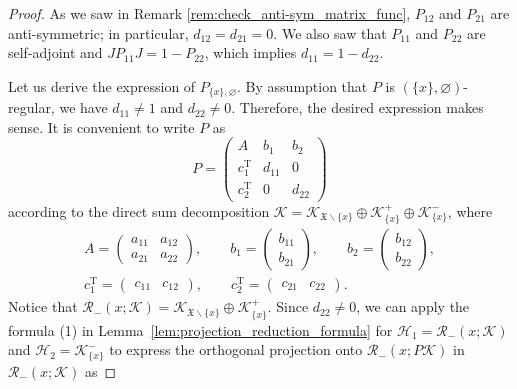 \documentclass[11pt]{article}
\numberwithin{equation}{section}
\numberwithin{equation}{section}
\newcommand{\mfrak}[1]{\mathfrak{#1}}
\newcommand{\mcal}[1]{\mathcal{#1}}
\newcommand{\mrm}[1]{\mathrm{#1}}
\begin{document}
\begin{proof}
As we saw in Remark \ref{rem:check_anti-sym_matrix_func}, $P_{12}$ and $P_{21}$ are anti-symmetric; in particular, $d_{12}=d_{21}=0$. We also saw that $P_{11}$ and $P_{22}$ are self-adjoint and $JP_{11}J=1-P_{22}$, which implies $d_{11}=1-d_{22}$.

Let us derive the expression of $P_{\{x\},\varnothing}$. By assumption that $P$ is $(\{x\},\varnothing)$-regular, we have $d_{11}\neq 1$ and $d_{22}\neq 0$. Therefore, the desired expression makes sense. It is convenient to write $P$ as
\begin{equation*}
	P=\left(
	\begin{matrix}
	A & b_{1} & b_{2} \\
	c_{1}^{\mrm{T}} & d_{11} & 0 \\
	c_{2}^{\mrm{T}} & 0 & d_{22}
	\end{matrix}
	\right)
\end{equation*}
according to the direct sum decomposition $\mcal{K}=\mcal{K}_{\mfrak{X}\backslash \{x\}}\oplus \mcal{K}_{\{x\}}^{+}\oplus \mcal{K}_{\{x\}}^{-}$, where
\begin{gather*}
	A =\left(
	\begin{matrix}
		a_{11} & a_{12} \\
		a_{21} & a_{22}
	\end{matrix}
	\right), \qquad
	b_{1} =\left(
	\begin{matrix}
		b_{11} \\
		b_{21}
	\end{matrix}
	\right), \qquad
	b_{2} =\left(
	\begin{matrix}
		b_{12} \\
		b_{22}
	\end{matrix}
	\right), \\
	c_{1}^{\mrm{T}} =\left(
	\begin{matrix}
		c_{11} & c_{12}
	\end{matrix}
	\right), \qquad
	c_{2}^{\mrm{T}} =\left(
	\begin{matrix}
		c_{21} & c_{22}
	\end{matrix}
	\right).
\end{gather*}
Notice that $\mcal{R}_{-}(x;\mcal{K})=\mcal{K}_{\mfrak{X}\backslash\{x\}}\oplus \mcal{K}_{\{x\}}^{+}$.
Since $d_{22}\neq 0$, we can apply the formula (1) in Lemma~\ref{lem:projection_reduction_formula} for $\mcal{H}_{1}=\mcal{R}_{-}(x;\mcal{K})$ and $\mcal{H}_{2}=\mcal{K}_{\{x\}}^{-}$ to express the orthogonal projection onto $\mcal{R}_{-}(x;P\mcal{K})$ in $\mcal{R}_{-}(x;\mcal{K})$ as

\end{proof}
\end{document}
